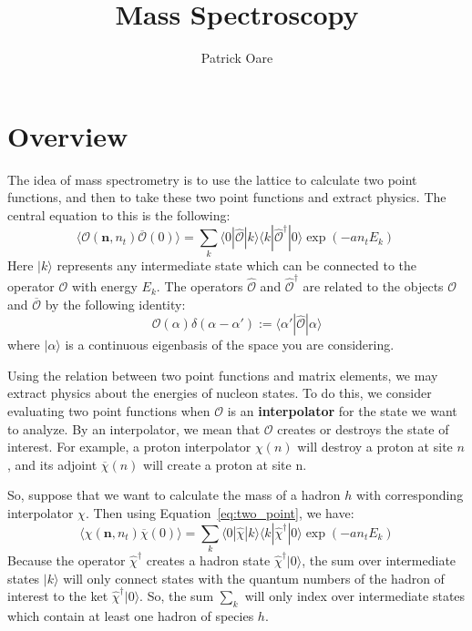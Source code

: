 \documentclass[11pt, oneside]{article}   	%
\title{Mass Spectroscopy}
\author{Patrick Oare}
\date{}							%
\theoremstyle{definition}
\begin{document}
\maketitle

\section{Overview}

The idea of mass spectrometry is to use the lattice to calculate two point functions, and then to take these 
two point functions and extract physics. The central equation to this is the following:
\begin{equation}
	\langle\mathcal O(\mathbf n, n_t)\overline{\mathcal O}(0)\rangle = \sum_k\langle 0|\hat{\mathcal O} 
	|k\rangle\langle k|\hat{\mathcal O}^\dagger |0\rangle\exp\left(-an_t E_k\right)~
	\label{eq:two_point}
\end{equation}
Here $|k\rangle$ represents any intermediate state which can be connected to the operator $\mathcal O$ 
with energy $E_k$. The operators $\hat{\mathcal O}$ and $\hat{\mathcal O}^\dagger$ are related to the 
objects $\mathcal O$ and $\overline{\mathcal O}$ by the following identity:
\begin{equation}
	\mathcal O(\alpha)\delta(\alpha - \alpha') := \langle \alpha' | \hat{\mathcal O} | \alpha\rangle
\end{equation}
where $|\alpha\rangle$ is a continuous eigenbasis of the space you are considering. 

Using the relation between two point functions and matrix elements, we may extract physics about the energies 
of nucleon states. To do this, we consider evaluating two point functions when $\mathcal O$ is an \textbf{interpolator} for the state we want to analyze. By an interpolator, we mean that $\mathcal O$ 
creates or destroys the state of interest. For example, a proton interpolator $\chi(n)$ will destroy a proton at 
site $n$, and its adjoint $\overline\chi(n)$ will create a proton at site n. 

So, suppose that we want to calculate the mass of a hadron $h$ with corresponding interpolator $\chi$. 
Then using Equation~\ref{eq:two_point}, we have:
\begin{equation}
	\langle\chi(\mathbf n, n_t)\overline\chi(0)\rangle = \sum_k\langle 0 |\hat\chi |k\rangle\langle k |
	\hat{\chi}^\dagger |0\rangle\exp(-an_t E_k)
\end{equation}
Because the operator $\hat{\chi}^\dagger$ creates a hadron state $\hat{\chi}^\dagger|0\rangle$, the 
sum over intermediate states $|k\rangle$ will only connect states with the quantum numbers of the hadron of 
interest to the ket $\hat{\chi}^\dagger|0\rangle$. So, the sum $\sum_k$ will only index over intermediate 
states which contain at least one hadron of species $h$. 
\end{document}
